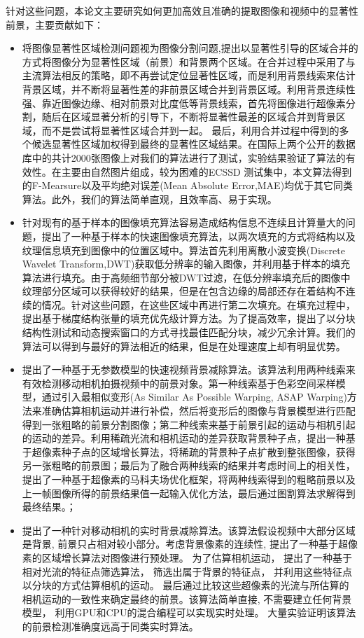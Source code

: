 \par
针对这些问题，本论文主要研究如何更加高效且准确的提取图像和视频中的显著性前景，主要贡献如下：
 \begin{itemize}
    \item 将图像显著性区域检测问题视为图像分割问题,提出以显著性引导的区域合并的方式将图像分为显著性区域（前景）和背景两个区域。在合并过程中采用了与主流算法相反的策略，即不再尝试定位显著性区域，而是利用背景线索来估计背景区域，并不断将显著性差的非前景区域合并到背景区域。利用背景连续性强、靠近图像边缘、相对前景对比度低等背景线索，首先将图像进行超像素分割，随后在区域显著分析的引导下，不断将显著性最差的区域合并到背景区域，而不是尝试将显著性区域合并到一起。 最后，利用合并过程中得到的多个候选显著性区域加权得到最终的显著性区域结果。在国际上两个公开的数据库中的共计2000张图像上对我们的算法进行了测试，实验结果验证了算法的有效性。在主要由自然图片组成，较为困难的ECSSD 测试集中，本文算法得到的F-Mearsure以及平均绝对误差(Mean Absolute Error,MAE)均优于其它同类算法。此外，我们的算法简单直观，且效率高、易于实现。
    \item 针对现有的基于样本的图像填充算法容易造成结构信息不连续且计算量大的问题，提出了一种基于样本的快速图像填充算法，以两次填充的方式将结构以及纹理信息填充到图像中的位置区域中。算法首先利用离散小波变换(Discrete Wavelet Transform,DWT)获取低分辨率的输入图像，并利用基于样本的填充算法进行填充。由于高频细节部分被DWT过滤，在低分辨率填充后的图像中纹理部分区域可以获得较好的结果，但是在包含边缘的局部还存在着结构不连续的情况。针对这些问题，在这些区域中再进行第二次填充。在填充过程中，提出基于梯度结构张量的填充优先级计算方法。为了提高效率，提出了以分块结构性测试和动态搜索窗口的方式寻找最佳匹配分块，减少冗余计算。我们的算法可以得到与最好的算法相近的结果，但是在处理速度上却有明显优势。
    \item 提出了一种基于无参数模型的快速视频背景减除算法。该算法利用两种线索来有效检测移动相机拍摄视频中的前景对象。第一种线索基于色彩空间采样模型，通过引入最相似变形(As Similar As Possible Warping, ASAP Warping)方法来准确估算相机运动并进行补偿，然后将变形后的图像与背景模型进行匹配得到一张粗略的前景分割图像；第二种线索来基于前景引起的运动与相机引起的运动的差异。利用稀疏光流和相机运动的差异获取背景种子点，提出一种基于超像素种子点的区域增长算法，将稀疏的背景种子点扩散到整张图像，获得另一张粗略的前景图；最后为了融合两种线索的结果并考虑时间上的相关性，提出了一种基于超像素的马科夫场优化框架，将两种线索得到的粗略前景以及上一帧图像所得的前景结果值一起输入优化方法，最后通过图割算法求解得到最终结果。；
    \item 提出了一种针对移动相机的实时背景减除算法。该算法假设视频中大部分区域是背景, 前景只占相对较小部分。考虑背景像素的连续性, 提出了一种基于超像素的区域增长算法对图像进行预处理。 为了估算相机运动， 提出了一种基于相对光流的特征点筛选算法， 筛选出属于背景的特征点， 并利用这些特征点以分块的方式估算相机的运动。 最后通过比较这些超像素的光流与所估算的相机运动的一致性来确定最终的前景。该算法简单直接, 不需要建立任何背景模型， 利用GPU和CPU的混合编程可以实现实时处理。 大量实验证明该算法的前景检测准确度远高于同类实时算法。
  \end{itemize}
